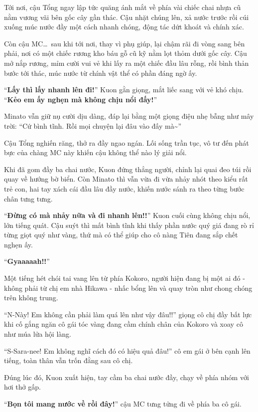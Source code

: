\documentclass[../main.tex]{subfiles}
\begin{document}
Tới nơi, cậu Tổng ngay lập tức quăng ánh mắt về phía vài chiếc chai nhựa cũ nằm vương vãi bên gốc cây gần thác. Cậu nhặt chúng lên, xả nước trước rồi cúi xuống múc nước đầy một cách nhanh chóng, động tác dứt khoát và chính xác.

Còn cậu MC\dots\ sau khi tới nơi, thay vì phụ giúp, lại chậm rãi đi vòng sang bên phải, nơi có một chiếc rương kho báu gỗ cũ kỹ nằm lọt thỏm dưới gốc cây. Cậu mở nắp rương, mỉm cười vui vẻ khi lấy ra một chiếc đầu lâu rỗng, rồi bình thản bước tới thác, múc nước từ chính vật thể có phần đáng ngờ ấy.

``\textbf{Lấy thì lấy nhanh lên đi!}'' Kuon gằn giọng, mắt liếc sang với vẻ khó chịu. ``\textbf{Kẻo em ấy nghẹn mà không chịu nổi đấy!}''

Minato vẫn giữ nụ cười dịu dàng, đáp lại bằng một giọng điệu nhẹ bẫng như mây trời: ``Cứ bình tĩnh. Rồi mọi chuyện lại đâu vào đấy mà\~{}''

Cậu Tổng nghiến răng, thở ra đầy ngao ngán. Lối sống trần tục, vô tư đến phát bực của chàng MC này khiến cậu không thể nào lý giải nổi.

Khi đã gom đầy ba chai nước, Kuon đứng thẳng người, chỉnh lại quai đeo túi rồi quay về hướng bờ biển. Còn Minato thì vẫn vừa đi vừa nhảy nhót theo kiểu rất trẻ con, hai tay xách cái đầu lâu đầy nước, khiến nước sánh ra theo từng bước chân tưng tưng.

``\textbf{Đừng có mà nhảy nữa và đi nhanh lên!!}'' Kuon cuối cùng không chịu nổi, lớn tiếng quát. Cậu suýt thì mất bình tĩnh khi thấy phần nước quý giá đang rò rỉ từng giọt quý như vàng, thứ mà có thể giúp cho cô nàng Tiên đang sắp chết nghẹn ấy.

\ct

``\textbf{Gyaaaaah!!}''

Một tiếng hét chói tai vang lên từ phía Kokoro, người hiện đang bị một ai đó - không phải từ chị em nhà Hikawa - nhấc bổng lên và quay tròn như chong chóng trên không trung.

``N-Này! Em không cần phải làm quá lên như vậy đâu!!'' giọng cô chị đầy bất lực khi cố gắng ngăn cô gái tóc vàng đang cầm chính chân của Kokoro và xoay cô như múa lửa hội làng.

``S-Sara-nee! Em không nghĩ cách đó có hiệu quả đâu!'' cô em gái ở bên cạnh lên tiếng, toàn thân vẫn trốn đằng sau cô chị.

Đúng lúc đó, Kuon xuất hiện, tay cầm ba chai nước đầy, chạy về phía nhóm với hơi thở gấp.

``\textbf{Bọn tôi mang nước về rồi đây!}'' cậu MC tưng tửng đi về phía ba cô gái.
\end{document}
